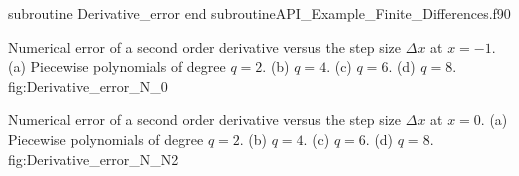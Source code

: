     \newpage
    \vspace{0.5cm} 
    {subroutine Derivative_error}
    {end subroutine}{API_Example_Finite_Differences.f90}
    
   
    
               {  }{  }
    { Numerical error of a second order derivative versus the step size $ \Delta x$ at \ensuremath{x=-1}. (a) Piecewise polynomials of degree \ensuremath{q=2}. (b) \ensuremath{q=4}. (c)  \ensuremath{q=6}. (d)  \ensuremath{q=8}. }{fig:Derivative_error_N_0}
    
    {  }{  }
    { Numerical error of a second order derivative versus the step size $ \Delta x$ at \ensuremath{x=0}. (a) Piecewise polynomials of degree \ensuremath{q=2}. (b)  \ensuremath{q=4}. (c)  \ensuremath{q=6}. (d)  \ensuremath{q=8}. }{fig:Derivative_error_N_N2}
    
    
    
    
    
    